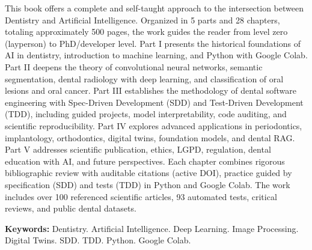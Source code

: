 
\begin{resumo}[Abstract]

This book offers a complete and self-taught approach to the intersection between Dentistry and Artificial Intelligence. Organized in 5 parts and 28 chapters, totaling approximately 500 pages, the work guides the reader from level zero (layperson) to PhD/developer level. Part I presents the historical foundations of AI in dentistry, introduction to machine learning, and Python with Google Colab. Part II deepens the theory of convolutional neural networks, semantic segmentation, dental radiology with deep learning, and classification of oral lesions and oral cancer. Part III establishes the methodology of dental software engineering with Spec-Driven Development (SDD) and Test-Driven Development (TDD), including guided projects, model interpretability, code auditing, and scientific reproducibility. Part IV explores advanced applications in periodontics, implantology, orthodontics, digital twins, foundation models, and dental RAG. Part V addresses scientific publication, ethics, LGPD, regulation, dental education with AI, and future perspectives. Each chapter combines rigorous bibliographic review with auditable citations (active DOI), practice guided by specification (SDD) and tests (TDD) in Python and Google Colab. The work includes over 100 referenced scientific articles, 93 automated tests, critical reviews, and public dental datasets.

\textbf{Keywords:} Dentistry. Artificial Intelligence. Deep Learning. Image Processing. Digital Twins. SDD. TDD. Python. Google Colab.
\end{resumo}
